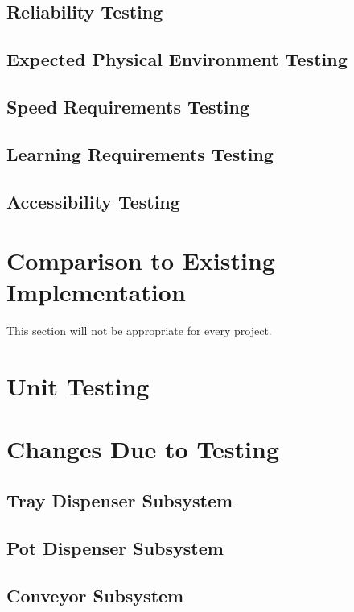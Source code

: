 \documentclass[12pt, titlepage]{article}
\begin{document}
\subsection{Reliability Testing}

\subsection{Expected Physical Environment Testing}

\subsection{Speed Requirements Testing}

\subsection{Learning Requirements Testing}

\subsection{Accessibility Testing}
	
\section{Comparison to Existing Implementation}	

This section will not be appropriate for every project.

\section{Unit Testing}

\section{Changes Due to Testing}
\subsection{Tray Dispenser Subsystem}

\subsection{Pot Dispenser Subsystem}

\subsection{Conveyor Subsystem}
\end{document}
